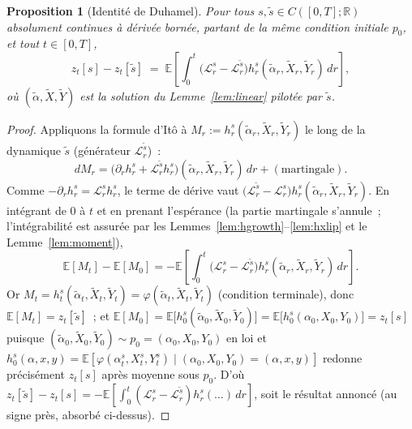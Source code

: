\documentclass[11pt,a4paper]{article}
\newcommand{\E}{\mathbb{E}}
\newcommand{\R}{\mathbb{R}}
\theoremstyle{plain}
\newtheorem{prop}[thm]{Proposition}
\theoremstyle{definition}
\begin{document}
\begin{prop}[Identit\'e de Duhamel]
\label{prop:duhamel}
Pour tous $s,\tilde s\in C([0,T];\R)$ absolument continues \`a d\'eriv\'ee born\'ee, partant de la m\^eme condition initiale $p_0$, et tout $t\in[0,T]$,
\[
z_t[s]-z_t[\tilde s] \;=\; \E\left[\int_0^t \big(\mathcal L^s_r-\mathcal L^{\tilde s}_r\big)h^s_r(\tilde\alpha_r,\tilde X_r,\tilde Y_r)\,dr\right],
\]
o\`u $(\tilde\alpha,\tilde X,\tilde Y)$ est la solution du Lemme~\ref{lem:linear} pilot\'ee par $\tilde s$.
\end{prop}
\begin{proof}
Appliquons la formule d'It\^o \`a $M_r:=h^s_r(\tilde\alpha_r,\tilde X_r,\tilde Y_r)$ le long de la dynamique $\tilde s$ (g\'en\'erateur $\mathcal L^{\tilde s}_r$)~:
\[
dM_r = \Big(\partial_r h^s_r+\mathcal L^{\tilde s}_r h^s_r\Big)(\tilde\alpha_r,\tilde X_r,\tilde Y_r)\,dr + (\text{martingale}).
\]
Comme $-\partial_rh^s_r=\mathcal L^s_rh^s_r$, le terme de d\'erive vaut $\big(\mathcal L^{\tilde s}_r-\mathcal L^s_r\big)h^s_r(\tilde\alpha_r,\tilde X_r,\tilde Y_r)$. En int\'egrant de $0$ \`a $t$ et en prenant l'esp\'erance (la partie martingale s'annule~; l'int\'egrabilit\'e est assur\'ee par les Lemmes~\ref{lem:hgrowth}--\ref{lem:hxlip} et le Lemme~\ref{lem:moment}),
\[
\E[M_t]-\E[M_0] = -\E\left[\int_0^t\big(\mathcal L^s_r-\mathcal L^{\tilde s}_r\big)h^s_r(\tilde\alpha_r,\tilde X_r,\tilde Y_r)\,dr\right].
\]
Or $M_t=h^s_t(\tilde\alpha_t,\tilde X_t,\tilde Y_t)=\varphi(\tilde\alpha_t,\tilde X_t,\tilde Y_t)$ (condition terminale), donc $\E[M_t]=z_t[\tilde s]$~; et $\E[M_0]=\E\big[h^s_0(\tilde\alpha_0,\tilde X_0,\tilde Y_0)\big]=\E\big[h^s_0(\alpha_0,X_0,Y_0)\big]=z_t[s]$ puisque $(\tilde\alpha_0,\tilde X_0,\tilde Y_0)\sim p_0=(\alpha_0,X_0,Y_0)$ en loi et $h^s_0(\alpha,x,y)=\E[\varphi(\alpha_t^s,X_t^s,Y_t^s)\mid(\alpha_0,X_0,Y_0)=(\alpha,x,y)]$ redonne pr\'ecis\'ement $z_t[s]$ apr\`es moyenne sous $p_0$. D'o\`u $z_t[\tilde s]-z_t[s]=-\E[\int_0^t(\mathcal L^s_r-\mathcal L^{\tilde s}_r)h^s_r(\ldots)\,dr]$, soit le r\'esultat annonc\'e (au signe pr\`es, absorb\'e ci-dessus).
\end{proof}
\end{document}
